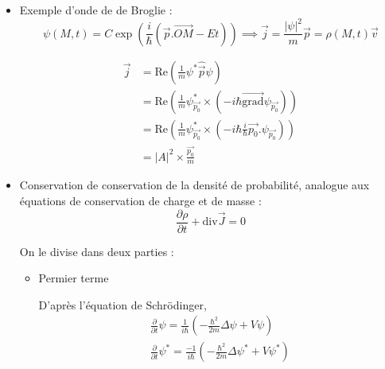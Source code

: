 \begin{itemize}
      
    \item Exemple d'onde de de Broglie : 
\begin{equation}
  \psi(M,t) = C \exp \left( \frac{i}{\hbar} ( \overrightarrow{p}. \overrightarrow{OM}- Et) \right) \implies \overrightarrow{j} = \frac{|\psi| ^{2}}{m}  \overrightarrow{p} = \rho(M,t) \overrightarrow{v}
\end{equation}

\begin{myproof}{}{}
\begin{align}
  \overrightarrow{j} &= \mathrm{Re} \left( \frac{1}{m}  \psi ^{*} \hat{ \overrightarrow{p}} \psi \right) \\
                     &= \mathrm{Re} \left( \frac{1}{m} \psi _{\overrightarrow{p_0}} ^{*} \times (-i \hbar \overrightarrow{\mathrm{grad}} \psi _{\overrightarrow{p_0}}) \right) \\
                     &= \mathrm{Re} \left( \frac{1}{m} \psi _{\overrightarrow{p_0}} ^{*} \times \left(-i \hbar \frac{i}{\hbar} \overrightarrow{p_0} . \psi _{\overrightarrow{p_0}}\right) \right) \\
                     &= |A| ^{2} \times \frac{\overrightarrow{p_0}}{m} 
\end{align}
\end{myproof}




    \item Conservation de conservation de la densité de probabilité, analogue aux équations de conservation de charge et de masse : 
      \begin{equation}
        \boxed{\frac{\partial \rho}{\partial t} + \mathrm{div} \overrightarrow{J} = 0}
      \end{equation}

    \begin{myproof}{}{}
     On le divise dans deux parties : 
     \begin{itemize}

         \item Permier terme 

           D'après l'équation de Schrödinger, 
           \begin{gather}
             \frac{\partial }{\partial t} \psi = \frac{1}{i \hbar}  \left( - \frac{\hbar ^{2}}{2m}  \Delta \psi + V \psi \right) \\
             \frac{\partial }{\partial t} \psi ^{*} = \frac{-1}{i \hbar}  \left( - \frac{\hbar ^{2}}{2m}  \Delta \psi ^{*} + V \psi  ^{*}\right)
           \end{gather}


\end{itemize}
\end{myproof}
\end{itemize}
